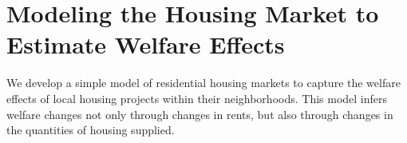 \documentclass[12pt]{article}
\begin{document}













\section{Modeling the Housing Market to Estimate Welfare Effects}\label{section:theory}

We develop a simple model of residential housing markets to capture the welfare effects of local housing projects within their neighborhoods.  This model infers welfare changes not only through changes in rents, but also through changes in the quantities of housing supplied.  
\end{document}
